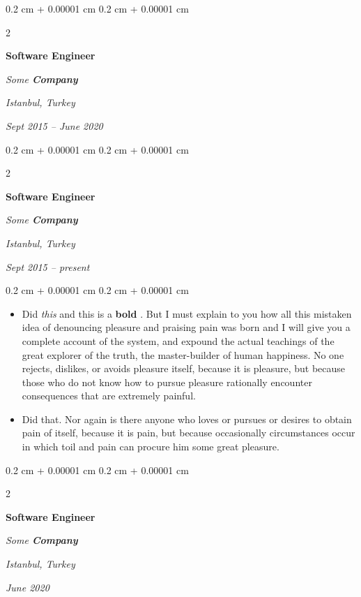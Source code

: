 \documentclass[10pt, letterpaper]{article}
\newenvironment{highlights}{
    \begin{itemize}[
        topsep=0.10 cm,
        parsep=0.10 cm,
        partopsep=0pt,
        itemsep=0pt,
        leftmargin=0.4 cm + 10pt
    ]
}{
    \end{itemize}
} %
\newenvironment{onecolentry}{
    \begin{adjustwidth}{
        0.2 cm + 0.00001 cm
    }{
        0.2 cm + 0.00001 cm
    }
}{
    \end{adjustwidth}
} %
\newenvironment{twocolentry}[2][]{
    \onecolentry
    \def\secondColumn{#2}
    \setcolumnwidth{\fill, 4.5 cm}
    \begin{paracol}{2}
}{
    \switchcolumn \raggedleft \secondColumn
    \end{paracol}
    \endonecolentry
} %
\let\hrefWithoutArrow\href
\renewcommand{\href}[2]{\hrefWithoutArrow{#1}{\ifthenelse{\equal{#2}{}}{ }{#2 }\raisebox{.15ex}{\footnotesize \faExternalLink*}}}
\begin{document}
        \vspace{0.2 cm}

            \begin{twocolentry}{
        \textit{Istanbul, Turkey}

        \textit{Sept 2015 – June 2020}    }
                \textbf{Software Engineer}

                \textit{Some \textbf{Company}}
            \end{twocolentry}



        \vspace{0.2 cm}

            \begin{twocolentry}{
        \textit{Istanbul, Turkey}

        \textit{Sept 2015 – present}    }
                \textbf{Software Engineer}

                \textit{Some \textbf{Company}}
            \end{twocolentry}

        \vspace{0.10 cm}
        \begin{onecolentry}
            \begin{highlights}
                \item Did \textit{this} and this is a \textbf{bold} \href{https://example.com}{link}. But I must explain to you how all this mistaken idea of denouncing pleasure and praising pain was born and I will give you a complete account of the system, and expound the actual teachings of the great explorer of the truth, the master-builder of human happiness. No one rejects, dislikes, or avoids pleasure itself, because it is pleasure, but because those who do not know how to pursue pleasure rationally encounter consequences that are extremely painful.
                \item Did that. Nor again is there anyone who loves or pursues or desires to obtain pain of itself, because it is pain, but because occasionally circumstances occur in which toil and pain can procure him some great pleasure.
            \end{highlights}
        \end{onecolentry}


        \vspace{0.2 cm}

            \begin{twocolentry}{
        \textit{Istanbul, Turkey}

        \textit{June 2020}    }
                \textbf{Software Engineer}

                \textit{Some \textbf{Company}}
            \end{twocolentry}
\end{document}
